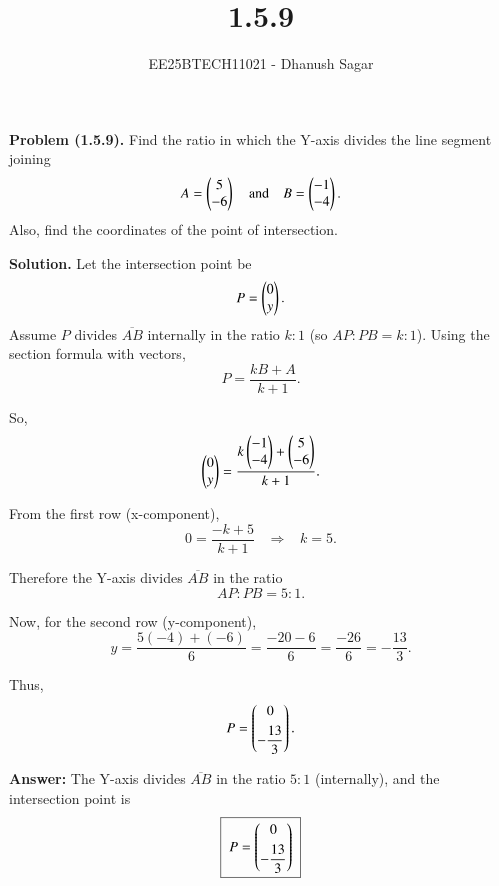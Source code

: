 \documentclass[journal]{IEEEtran}
\begin{document}



\title{1.5.9}
\author{EE25BTECH11021 - Dhanush Sagar
}
{\let\newpage\relax\maketitle}

\renewcommand{\thefigure}{\theenumi}
\renewcommand{\thetable}{\theenumi}
\setlength{\intextsep}{10pt} %


\renewcommand{\thetable}{\theenumi}



\textbf{Problem (1.5.9).} Find the ratio in which the Y-axis divides the line segment joining
\[
A=\begin{pmatrix}5\\-6\end{pmatrix} \quad \text{and} \quad B=\begin{pmatrix}-1\\-4\end{pmatrix}.
\]
Also, find the coordinates of the point of intersection.


\textbf{Solution.}  
Let the intersection point be 
\[
P=\begin{pmatrix}0\\y\end{pmatrix}.
\]
Assume \(P\) divides \(\overline{AB}\) internally in the ratio \(k:1\) (so \(AP:PB=k:1\)).  
Using the section formula with vectors,
\[
P=\frac{kB+A}{k+1}.
\]

So,
\[
\begin{pmatrix}0\\y\end{pmatrix} 
= \frac{k\begin{pmatrix}-1\\-4\end{pmatrix}+\begin{pmatrix}5\\-6\end{pmatrix}}{k+1}.
\]

From the first row (x-component),
\[
0=\frac{-k+5}{k+1} \;\;\;\Longrightarrow\;\;\; k=5.
\]

Therefore the Y-axis divides \(\overline{AB}\) in the ratio
\[
AP:PB=5:1.
\]

Now, for the second row (y-component),
\[
y=\frac{5(-4)+(-6)}{6} 
=\frac{-20-6}{6} 
=\frac{-26}{6} 
=-\frac{13}{3}.
\]

Thus,
\[
P=\begin{pmatrix}0\\[4pt]-\dfrac{13}{3}\end{pmatrix}.
\]

\textbf{Answer:} The Y-axis divides \(\overline{AB}\) in the ratio \(5:1\) (internally), and the intersection point is
\[
\boxed{\;P=\begin{pmatrix}0\\[4pt]-\dfrac{13}{3}\end{pmatrix}\;}
\]
\end{document}
